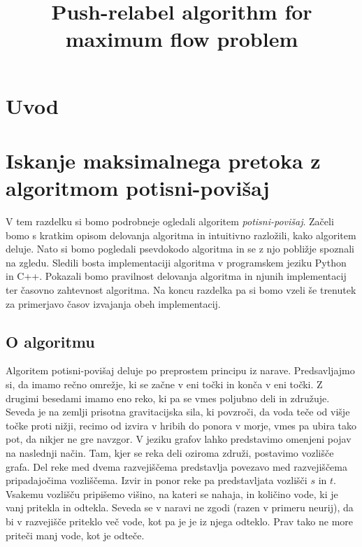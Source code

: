 \documentclass[mat1]{fmfdelo}
\title{Push-relabel algorithm for maximum flow problem}
\begin{document}
\section{Uvod}

\section{Iskanje maksimalnega pretoka z algoritmom potisni-povišaj}

V tem razdelku si bomo podrobneje ogledali algoritem \textit{potisni-povišaj}. Začeli bomo s kratkim opisom delovanja algoritma in intuitivno razložili, kako algoritem deluje. Nato si bomo pogledali psevdokodo algoritma in se z njo pobližje spoznali na zgledu. Sledili bosta implementaciji algoritma v programskem jeziku Python in C++. Pokazali bomo pravilnost delovanja algoritma in njunih implementacij ter časovno zahtevnost algoritma. Na koncu razdelka pa si bomo vzeli še trenutek za primerjavo časov izvajanja obeh implementacij.

\subsection{O algoritmu}
Algoritem potisni-povišaj deluje po preprostem principu iz narave. Predsavljajmo si, da imamo rečno omrežje, ki se začne v eni točki in konča v eni točki. Z drugimi besedami imamo eno reko, ki pa se vmes poljubno deli in združuje. Seveda je na zemlji prisotna gravitacijska sila, ki povzroči, da voda teče od višje točke proti nižji, recimo od izvira v hribih do ponora v morje, vmes pa ubira tako pot, da nikjer ne gre navzgor. V jeziku grafov lahko predstavimo omenjeni pojav na naslednji način. Tam, kjer se reka deli oziroma združi, postavimo vozlišče grafa. Del reke med dvema razvejiščema predstavlja povezavo med razvejiščema pripadajočima vozliščema. Izvir in ponor reke pa predstavljata vozlišči $s$ in $t$. Vsakemu vozlišču pripišemo višino, na kateri se nahaja, in količino vode, ki je vanj pritekla in odtekla. Seveda se v naravi ne zgodi (razen v primeru neurij), da bi v razvejišče priteklo več vode, kot pa je je iz njega odteklo. Prav tako ne more priteči manj vode, kot je odteče.
\end{document}
